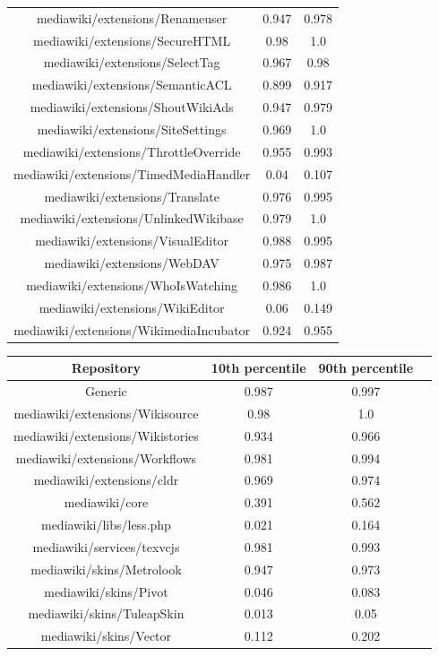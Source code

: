 \begin{table}[H]
\begin{tabular}{@{}c c c@{}}
mediawiki/extensions/Renameuser & 0.947 & 0.978 \\
mediawiki/extensions/SecureHTML & 0.98 & 1.0 \\
mediawiki/extensions/SelectTag & 0.967 & 0.98 \\
mediawiki/extensions/SemanticACL & 0.899 & 0.917 \\
mediawiki/extensions/ShoutWikiAds & 0.947 & 0.979 \\
mediawiki/extensions/SiteSettings & 0.969 & 1.0 \\
mediawiki/extensions/ThrottleOverride & 0.955 & 0.993 \\
mediawiki/extensions/TimedMediaHandler & 0.04 & 0.107 \\
mediawiki/extensions/Translate & 0.976 & 0.995 \\
mediawiki/extensions/UnlinkedWikibase & 0.979 & 1.0 \\
mediawiki/extensions/VisualEditor & 0.988 & 0.995 \\
mediawiki/extensions/WebDAV & 0.975 & 0.987 \\
mediawiki/extensions/WhoIsWatching & 0.986 & 1.0 \\
mediawiki/extensions/WikiEditor & 0.06 & 0.149 \\
mediawiki/extensions/WikimediaIncubator & 0.924 & 0.955 \\
    \hline
\end{tabular}
    \label{table:accuracy-score-repo-specific-and-generic-appendix-c-part-4}
\end{table}

\begin{table}[H]
    \centering
    \begin{tabular}{@{}c c c c@{}} 
    \hline
    \textbf{Repository} & \textbf{10th percentile} & \textbf{90th percentile} \\
    \hline
    Generic & 0.987 & 0.997 \\
mediawiki/extensions/Wikisource & 0.98 & 1.0 \\
mediawiki/extensions/Wikistories & 0.934 & 0.966 \\
mediawiki/extensions/Workflows & 0.981 & 0.994 \\
mediawiki/extensions/cldr & 0.969 & 0.974 \\
mediawiki/core & 0.391 & 0.562 \\
mediawiki/libs/less.php & 0.021 & 0.164 \\
mediawiki/services/texvcjs & 0.981 & 0.993 \\
mediawiki/skins/Metrolook & 0.947 & 0.973 \\
mediawiki/skins/Pivot & 0.046 & 0.083 \\
mediawiki/skins/TuleapSkin & 0.013 & 0.05 \\
mediawiki/skins/Vector & 0.112 & 0.202 \\
    \hline
\end{tabular}
    
    \label{table:accuracy-score-repo-specific-and-generic-appendix-c-part-5}
\end{table}

